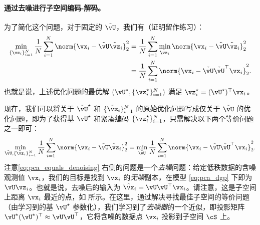 \documentclass[../../book-main_zh.tex]{subfiles}
\begin{document}
\paragraph{通过去噪进行子空间编码-解码。}
为了简化这个问题，对于固定的 \(\tilde{\vU}\)，我们有（证明留作练习）：
\begin{align}
    \min_{\{\tilde{\vz}_{i}\}_{i = 1}^{N}}\frac{1}{N}\sum_{i =
    1}^{N}\norm{\vx_{i} - \tilde{\vU}\tilde{\vz}_{i}}_{2}^{2}
    &= \frac{1}{N}\sum_{i = 1}^{N}\min_{\tilde{\vz}_{i}}\norm{\vx_{i}
    - \tilde{\vU}\tilde{\vz}_{i}}_{2}^{2} \\
    &= \frac{1}{N}\sum_{i = 1}^{N}\norm{\vx_{i} -
    \tilde{\vU}\tilde{\vU}^{\top}\vx_{i}}_{2}^{2}.
\end{align}
也就是说，上述优化问题的最优解 \((\vU^{\star}, \{\vz_{i}^{\star}\}_{i = 1}^{N})\) 满足
$\vz_i^{\star} = (\vU^{\star})^\top\vx_i$。

现在，我们可以将关于 \(\tilde{\vU}^{\star}\) 和 \(\{\tilde{\vz}_{i}\}_{i =
1}^{N}\) 的原始优化问题写成仅关于 \(\tilde{\vU}\) 的优化问题，即为了获得基 \(\vU^{\star}\)
和紧凑编码 \(\{\vz_{i}^{\star}\}_{i = 1}^{N}\)，只需解决以下两个等价问题之一即可：
\begin{equation}\label{eq:pca_equals_denoising}
    \min_{\tilde{\vU}, \{\tilde{\vz}_{i}\}_{i =
    1}^{N}}\frac{1}{N}\sum_{i = 1}^{N}\norm{\vx_{i} -
    \tilde{\vU}\tilde{\vz}_{i}}_{2}^{2} =
    \min_{\tilde{\vU}}\frac{1}{N}\sum_{i = 1}^{N}\norm{\vx_{i} -
    \tilde{\vU}\tilde{\vU}^{\top}\vx_{i}}_{2}^{2}.
\end{equation}
注意\eqref{eq:pca_equals_denoising}
右侧的问题是一个\textit{去噪}问题：给定低秩数据的含噪观测值 \(\vx_{i}\)，我们的目标是找到 \(\vx_{i}\)
的\textit{无噪}副本，在模型 \eqref{eq:pca_dgp} 下即为 $\vU\vz_{i}$。也就是说，去噪后的输入为
$\hat{\vx}_i = \vU\vU^\top \vx_i$。请注意，这是子空间上距离 $\vx_i$ 最近的点，如
 所示。在这里，通过解决寻找最佳子空间的等价问题（由学习到的基
\(\vU^{\star}\) 参数化），我们学习到了\textit{去噪器}的一个近似，即投影矩阵
\(\vU^{\star}(\vU^{\star})^{\top} \approx \vU\vU^{\top}\)，它将含噪的数据点
$\vx_i$ 投影到子空间 \(\cS\) 上。 %
\end{document}
